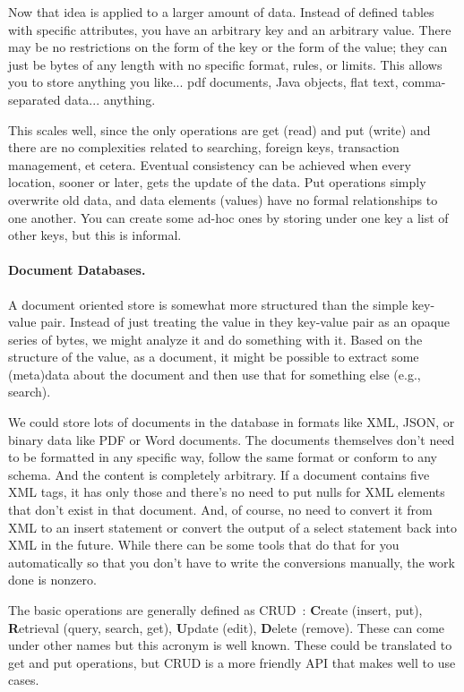 Now that idea is applied to a larger amount of data. Instead of defined tables with specific attributes, you have an arbitrary key and an arbitrary value. There may be no restrictions on the form of the key or the form of the value; they can just be  bytes of any length with no specific format, rules, or limits. This allows you to store anything you like... pdf documents, Java objects, flat text, comma-separated data... anything.

This scales well, since the only operations are get (read) and put (write) and there are no complexities related to searching, foreign keys, transaction management, et cetera. Eventual consistency can be achieved when every location, sooner or later, gets the update of the data. Put operations simply overwrite old data, and data elements (values) have no formal relationships to one another. You can create some ad-hoc ones by storing under one key a list of other keys, but this is informal.

\paragraph{Document Databases.} 

A document oriented store is somewhat more structured than the simple key-value pair. Instead of just treating the value in they key-value pair as an opaque series of bytes, we might analyze it and do something with it. Based on the structure of the value, as a document, it might be possible to extract some (meta)data about the document and then use that for something else (e.g., search). 

We could store lots of documents in the database in formats like XML, JSON, or binary data like PDF or Word documents. The documents themselves don't need to be formatted in any specific way, follow the same format or conform to any schema. And the content is completely arbitrary. If a document contains five XML tags, it has only those and there's no need to put nulls for XML elements that don't exist in that document. And, of course, no need to convert it from XML to an insert statement or convert the output of a select statement back into XML in the future. While there can be some tools that do that for you automatically so that you don't have to write the conversions manually, the work done is nonzero.

The basic operations are generally defined as CRUD~\cite{martin1983managing}: \textbf{C}reate (insert, put), \textbf{R}etrieval (query, search, get), \textbf{U}pdate (edit), \textbf{D}elete (remove). These can come under other names but this acronym is well known. These could be translated to get and put operations, but CRUD is a more friendly API that makes well to use cases.

